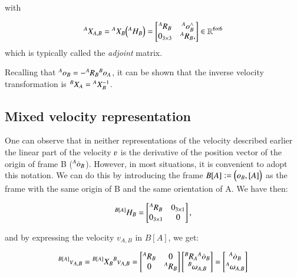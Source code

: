 with

\begin{equation}\label{def_adjoint_matrix}
    {}^{A}{X}_{A,B} = {}^{A}{X}_{B} \Big({}^{A}{H}_{B} \Big) = 
    \begin{bmatrix}
        {}^{A}{R}_{B} & {}^{A}{o}_{B}^{\wedge} \\
        0_{3 \times 3} & {}^{A}{R}_{B},
    \end{bmatrix} \in \mathbb{R}^{6 \times 6}
\end{equation}
which is typically called the \textit{adjoint} matrix.

Recalling that ${}^{A}{o}_{B} = -{}^{A}{R}_{B}{}^{B}{o}_{A}$, it can be shown that the inverse velocity transformation is ${}^{B}{X}_{A} = {}^{A}{X}_{B}^{-1}$.

\subsection{Mixed velocity representation}
One can observe that in neither representations of the velocity described earlier the linear part of the velocity $\varv$ is the derivative of the position vector of the origin of frame B (${}^{A}{\dot{o}}_{B}$). However, in most situations, it is convenient to adopt this notation. We can do this by introducing the frame $B[A] \vcentcolon= \Big( o_B, [A] \Big)$ as the frame with the same origin of B and the same orientation of A. We have then:

\begin{equation}\label{def_mixed_velocity_frame}
    {}^{B[A]}{H}_{B} = 
    \begin{bmatrix}
        {}^{A}{R}_{B} & 0_{3\times 1}\\
        0_{3\times 1} & 0
    \end{bmatrix},
\end{equation}

and by expressing the velocity $v_{A,B}$ in $B[A]$, we get:

\begin{equation}\label{def_mixed_velocity}
    {}^{B[A]}{v}_{A,B} = {}^{B[A]}{X}_{B}{}^{B}{v}_{A,B} = 
    \begin{bmatrix}
        {}^{A}{R}_{B} & 0\\
        0 & {}^{A}{R}_{B}
    \end{bmatrix}
    \begin{bmatrix}
        {}^{B}{R}_{A}{}^{A}{\dot{o}}_{B}\\
        {}^{B}{\omega}_{A,B}
    \end{bmatrix} = 
    \begin{bmatrix}
        {}^{A}{\dot{o}}_{B}\\
        {}^{A}{\omega}_{A,B}
    \end{bmatrix}
\end{equation}

